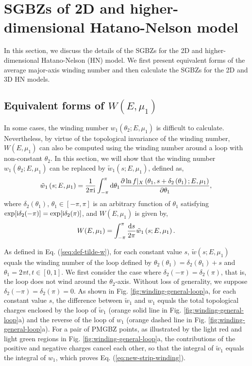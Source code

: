 \documentclass[pdflatex,sn-nature, iicol]{sn-jnl}%
\theoremstyle{thmstyleone}%
\theoremstyle{thmstyletwo}%
\theoremstyle{thmstylethree}%
\begin{document}
\pagebreak
\section{SGBZs of 2D and higher-dimensional Hatano-Nelson model}

\label{sec:SGBZs-HN}

In this section, we discuss the details of the SGBZs for the 2D and
higher-dimensional Hatano-Nelson (HN) model. We first present equivalent
forms of the average major-axis winding number and then calculate the SGBZs for
the 2D and 3D HN models.

\subsection{Equivalent forms of $W(E, \mu_1)$ }

\label{subsec:Equivalent-forms}

In some cases, the winding number $w_{1}(\theta_{2};E,\mu_{1})$ is
difficult to calculate. Nevertheless, by virtue of the topological
invariance of the winding number, $W(E, \mu_1)$ can also
be computed using the winding number around a loop with non-constant
$\theta_{2}$. In this section, we will show that the winding number
$w_{1}(\theta_{2};E,\mu_{1})$ can be replaced by $\tilde{w}_{1}(s;E,\mu_{1})$,
defined as, 
\begin{equation}
\tilde{w}_{1}\left(s;E,\mu_{1}\right)=\frac{1}{2\pi\mathrm{i}}\int_{-\pi}^{\pi}\mathrm{d}\theta_{1}\frac{\partial\ln f|_{X}\left(\theta_{1},s+\delta_{2}\left(\theta_{1}\right);E,\mu_{1}\right)}{\partial\theta_{1}},\label{seq:def-tilde-w}
\end{equation}
where $\delta_{2}(\theta_{1})$, $\theta_{1}\in[-\pi,\pi]$ is an
arbitrary function of $\theta_{1}$ satisfying $\exp[\mathrm{i}\delta_{2}(-\pi)]=\exp[\mathrm{i}\delta_{2}(\pi)]$,
and $W(E, \mu_1)$ is given by, 
\begin{equation}
W(E,\mu_{1})=\int_{-\pi}^{\pi}\frac{\mathrm{d} s}{2\pi}\tilde{w}_{1}\left(s;E,\mu_{1}\right).\label{eq:new-strip-winding}
\end{equation}

As defined in Eq. (\ref{seq:def-tilde-w}), for each constant value
$s$, $\tilde{w}(s;E,\mu_{1})$ equals the winding number of the loop
defined by $\theta_{2}(\theta_{1})=\delta_{2}(\theta_{1})+s$ and
$\theta_{1}=2\pi t,t\in[0,1]$. We first consider the case where $\delta_{2}(-\pi)=\delta_{2}(\pi)$,
that is, the loop does not wind around the $\theta_{2}$-axis. Without
loss of generality, we suppose $\delta_{2}(-\pi)=\delta_{2}(\pi)=0$.
As shown in Fig. \ref{fig:winding-general-loop}a, for each constant
value $s$, the difference between $\tilde{w}_{1}$ and $w_{1}$ equals
the total topological charges enclosed by the loop of $\tilde{w}_{1}$
(orange solid line in Fig. \ref{fig:winding-general-loop}a) and the
reverse of the loop of $w_{1}$ (orange dashed line in Fig. \ref{fig:winding-general-loop}a).
For a pair of PMGBZ points, as illustrated by the light red and light
green regions in Fig. \ref{fig:winding-general-loop}a, the contributions
of the positive and negative charges cancel each other, so that the
integral of $\tilde{w}_{1}$ equals the integral of $w_{1}$, which
proves Eq. (\ref{eq:new-strip-winding}).
\end{document}
